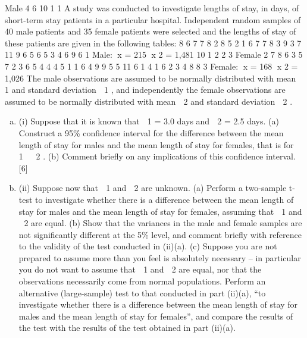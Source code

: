 \documentclass[a4paper,12pt]{article}
\begin{document}
Male
4
6
10
1
1
A study was conducted to investigate lengths of stay, in days, of short-term stay patients in a particular hospital. Independent random samples of 40 male patients and 35 female patients were selected and the lengths of stay of these patients are given in
the following tables:
8
6
7
7
8
2
8
5
2
1
6
7
7
8
3
9
3
7
11
9
6
5
6
5
3
4
6
9
6
1
Male: x = 215 x 2 = 1,481
10
1
2
2
3
Female
2
7
8
6
3
5
7
2
3
6
5
4
4
4
5
1
1
6
4
9
9
5
5
11
6
1
4
1
6
2
3
4
8
8
3
Female: x = 168 x 2 = 1,026
The male observations are assumed to be normally distributed with mean  1 and
standard deviation  1 , and independently the female observations are assumed to be
normally distributed with mean  2 and standard deviation  2 .

\begin{enumerate}[(a)]
\item (i)
Suppose that it is known that  1 = 3.0 days and  2 = 2.5 days.
(a) Construct a 95\% confidence interval for the difference between the
mean length of stay for males and the mean length of stay for females,
that is for  1   2 .
(b) Comment briefly on any implications of this confidence interval.
[6]
\item (ii)
Suppose now that  1 and  2 are unknown.
(a) Perform a two-sample t-test to investigate whether there is a difference between the mean length of stay for males and the mean length of stay for females, assuming that  1 and  2 are equal.
(b) Show that the variances in the male and female samples are not significantly different at the 5\% level, and comment briefly with reference to the validity of the test conducted in (ii)(a).
(c) Suppose you are not prepared to assume more than you feel is absolutely necessary – in particular you do not want to assume that  1 and  2 are equal, nor that the observations necessarily come from normal populations.
Perform an alternative (large-sample) test to that conducted in part (ii)(a), “to investigate whether there is a difference between the mean length of stay for males and the mean length of stay for females”, and
compare the results of the test with the results of the test obtained in
part (ii)(a).
\end{enumerate}
\newpage
\end{document}
